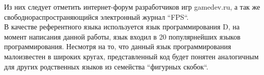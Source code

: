 Из них следует отметить интернет-форум разработчиков игр gamedev.ru,
а так же свободнораспространяющийся электронный журнал ``FPS``.
\\

В качестве референтного языка используется язык программирования D,
на момент написания данной работы, язык входил в 20 популярнейших языков
программирования. Несмотря на то, что данный язык программирования 
малоизвестен в широких кругах, представленный код будет понятен аналогичным 
для других родственных языков из семейства ``фигурных скобок``.


